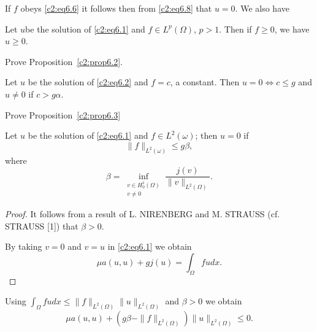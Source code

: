 If $f$ obeys \eqref{c2:eq6.6} it follows then from 
\eqref{c2:eq6.8} that $u = 0$. We also have 

\begin{proposition}\label{c2:prop6.2}%
Let $u$\pageoriginale  be the solution of \eqref{c2:eq6.1} and $f \in L^p (\Omega )$, $p >
1$. Then if $f \geq 0$, we have $u \geq 0$. 
\end{proposition}

\begin{exercise}\label{c2:exer6.2}%
Prove Proposition~\ref{c2:prop6.2}.
\end{exercise}

\begin{proposition}\label{c2:prop6.3}%
 Let $u$ be the solution of \eqref{c2:eq6.2} and $f = c$, a
 constant. Then $u =0  \iff c \leq g$ and $u \neq 0$ if $c > g
 \alpha$.    
\end{proposition}

\begin{exercise}\label{c2:exer6.3}%
Prove Proposition~\ref{c2:prop6.3}
\end{exercise}

\begin{proposition}\label{c2:prop6.4}%
Let $u$ be the solution of \eqref{c2:eq6.1} and $f \in L^2
(\omega)$; then $u = 0$ if  
\begin{equation}
\parallel f\parallel_{L^2 (\omega )} \leq g \beta, \tag{6.9}\label{c2:eq6.9}
\end{equation}
where 
$$
\beta= \inf_{\substack{v \in H^1_0 (\Omega) \\ v \neq 0}}
\dfrac{j (v)}{\parallel  v\parallel_{L^2 (\Omega )}}. 
$$
\end{proposition}

\begin{proof}
It follows from a result of L. NIRENBERG and M. STRAUSS (cf. STRAUSS
[1]) that $\beta > 0$. 

 By taking $v = 0$ and $v = u$ in \eqref{c2:eq6.1}  we obtain
\begin{equation}
\mu a (u, u) + gj (u) = \int_\Omega fu dx. \tag{6.10}\label{c2:eq6.10}
\end{equation}
\end{proof}

Using $\int_\Omega fu dx \leq \parallel  f \parallel_{L^2 (\Omega
  )}\parallel  u \parallel_{L^2 (\Omega)}$ and $\beta > 0$ we obtain  
\begin{equation}
\mu a (u, u) + (g \beta - \parallel  f \parallel_{L^2 (\Omega)}) \parallel  u \parallel_{L^2
  (\Omega)} \leq 0. \tag{6.11}\label{c2:eq6.11} 
\end{equation}

